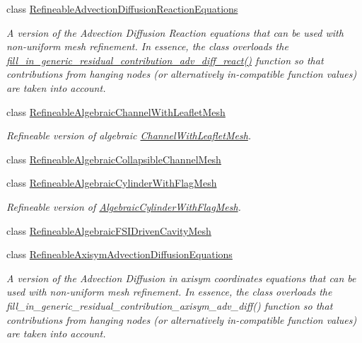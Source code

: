 \begin{DoxyCompactItemize}
class \hyperlink{classoomph_1_1RefineableAdvectionDiffusionReactionEquations}{Refineable\+Advection\+Diffusion\+Reaction\+Equations}
\begin{DoxyCompactList}\small\item\em A version of the Advection Diffusion Reaction equations that can be used with non-\/uniform mesh refinement. In essence, the class overloads the \hyperlink{classoomph_1_1RefineableAdvectionDiffusionReactionEquations_ac00be5fb705024129d006f2ed2d80eab}{fill\+\_\+in\+\_\+generic\+\_\+residual\+\_\+contribution\+\_\+adv\+\_\+diff\+\_\+react()} function so that contributions from hanging nodes (or alternatively in-\/compatible function values) are taken into account. \end{DoxyCompactList}\item 
class \hyperlink{classoomph_1_1RefineableAlgebraicChannelWithLeafletMesh}{Refineable\+Algebraic\+Channel\+With\+Leaflet\+Mesh}
\begin{DoxyCompactList}\small\item\em Refineable version of algebraic \hyperlink{classoomph_1_1ChannelWithLeafletMesh}{Channel\+With\+Leaflet\+Mesh}. \end{DoxyCompactList}\item 
class \hyperlink{classoomph_1_1RefineableAlgebraicCollapsibleChannelMesh}{Refineable\+Algebraic\+Collapsible\+Channel\+Mesh}
\item 
class \hyperlink{classoomph_1_1RefineableAlgebraicCylinderWithFlagMesh}{Refineable\+Algebraic\+Cylinder\+With\+Flag\+Mesh}
\begin{DoxyCompactList}\small\item\em Refineable version of \hyperlink{classoomph_1_1AlgebraicCylinderWithFlagMesh}{Algebraic\+Cylinder\+With\+Flag\+Mesh}. \end{DoxyCompactList}\item 
class \hyperlink{classoomph_1_1RefineableAlgebraicFSIDrivenCavityMesh}{Refineable\+Algebraic\+F\+S\+I\+Driven\+Cavity\+Mesh}
\item 
class \hyperlink{classoomph_1_1RefineableAxisymAdvectionDiffusionEquations}{Refineable\+Axisym\+Advection\+Diffusion\+Equations}
\begin{DoxyCompactList}\small\item\em A version of the Advection Diffusion in axisym coordinates equations that can be used with non-\/uniform mesh refinement. In essence, the class overloads the fill\+\_\+in\+\_\+generic\+\_\+residual\+\_\+contribution\+\_\+axisym\+\_\+adv\+\_\+diff() function so that contributions from hanging nodes (or alternatively in-\/compatible function values) are taken into account. \end{DoxyCompactList}\item 

\end{DoxyCompactItemize}
